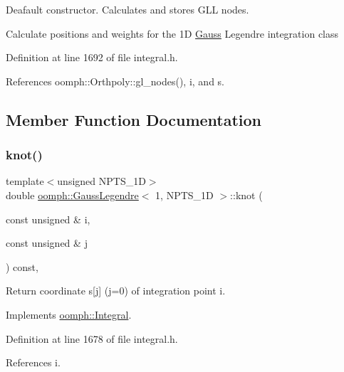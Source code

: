 Deafault constructor. Calculates and stores G\+LL nodes. 

Calculate positions and weights for the 1D \hyperlink{classoomph_1_1Gauss}{Gauss} Legendre integration class 

Definition at line 1692 of file integral.\+h.



References oomph\+::\+Orthpoly\+::gl\+\_\+nodes(), i, and s.



\subsection{Member Function Documentation}
\mbox{\label{classoomph_1_1GaussLegendre_3_011_00_01NPTS__1D_01_4_a315e14d529ea5e9945e0a23da4fa9790}} 
\subsubsection{\texorpdfstring{knot()}{knot()}}
{\footnotesize\ttfamily template$<$unsigned N\+P\+T\+S\+\_\+1D$>$ \\
double \hyperlink{classoomph_1_1GaussLegendre}{oomph\+::\+Gauss\+Legendre}$<$ 1, N\+P\+T\+S\+\_\+1D $>$\+::knot (\begin{DoxyParamCaption}\item[{const unsigned \&}]{i,  }\item[{const unsigned \&}]{j }\end{DoxyParamCaption}) const\hspace{0.3cm}{\ttfamily [inline]}, {\ttfamily [virtual]}}



Return coordinate s\mbox{[}j\mbox{]} (j=0) of integration point i. 



Implements \hyperlink{classoomph_1_1Integral_a1a2122f99a87c18649bafdd9ed739758}{oomph\+::\+Integral}.



Definition at line 1678 of file integral.\+h.



References i.

